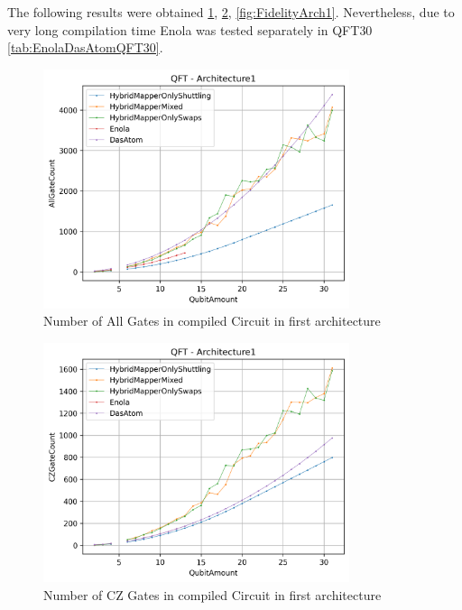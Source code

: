 The following results were obtained \ref{fig:AllGateCountArch1},
\ref{fig:CZGateCountArch1}, \ref{fig:FidelityArch1}. 
Nevertheless, due to very long compilation time Enola was tested separately in \ac{QFT}30 \ref{tab:EnolaDasAtomQFT30}.
\begin{figure}[htbp]
  \centering
    \includegraphics[width=0.8\textwidth]{figures/AllGateCountArch1.png}
    \caption[All Gate Number of first Architecture]{Number of All Gates in compiled Circuit in first architecture}
    \label{fig:AllGateCountArch1}
\end{figure}
\begin{figure}[htbp]
  \centering
    \includegraphics[width=0.8\textwidth]{figures/CZGateCountArch1.png}
    \caption[CZ Gate Number for first Architecture]{Number of CZ Gates in compiled Circuit in first architecture}
    \label{fig:CZGateCountArch1}
\end{figure}
